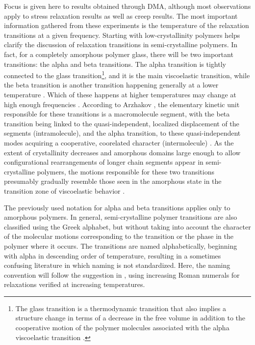Focus is given here to results obtained through DMA, although most observations apply to stress relaxation results as well as creep results.
The most important information gathered from these experiments is the temperature of the relaxation transitions at a given frequency.
Starting with low-crystallinity polymers helps clarify the discussion of relaxation transitions in semi-crystalline polymers.
In fact, for a completely amorphous polymer glass, there will be two important transitions: the alpha and beta transitions.
The alpha transition is tightly connected to the glass transition\footnote{The glass transition is a thermodynamic transition that also implies a structure change in terms of a decrease in the free volume in addition to the cooperative motion of the polymer molecules associated with the alpha viscoelastic transition \citep{arzhakovRelaxationPhysicalMechanical2019}.}, and it is the main viscoelastic transition, while the beta transition is another transition happening generally at a lower temperature \citep{arzhakovRelaxationPhysicalMechanical2019}.
Which of these happens at higher temperatures may change at high enough frequencies \citep{matsuokaThermodynamicTheoryViscoelasticity1996}.
According to Arzhakov \citep{arzhakovRelaxationPhysicalMechanical2019}, the elementary kinetic unit responsible for these transitions is a macromolecule segment, with the beta transition being linked to the quasi-independent, localized displacement of the segments (intramolecule), and the alpha transition, to these quasi-independent modes acquiring a cooperative, coorelated character (intermolecule) \citep{bershteinGeneralMechanismTransition1985, matsuokaThermodynamicTheoryViscoelasticity1996}.
As the extent of crystallinity decreases and amorphous domains large enough to allow configurational rearrangements of longer chain segments appear in semi-crystalline polymers, the motions responsible for these two transitions presumably gradually resemble those seen in the amorphous state in the transition zone of viscoelastic behavior \citep{ferryViscoelasticPropertiesPolymers1980}.

The previously used notation for alpha and beta transitions applies only to amorphous polymers.
In general, semi-crystalline polymer transitions are also classified using the Greek alphabet, but without taking into account the character of the molecular motions corresponding to the transition or the phase in the polymer where it occurs.
The transitions are named alphabetically, beginning with alpha in descending order of temperature, resulting in a sometimes confusing literature in which naming is not standardized.
Here, the naming convention will follow the suggestion in \cite{arzhakovRelaxationPhysicalMechanical2019}, using increasing Roman numerals for relaxations verified at increasing temperatures.

